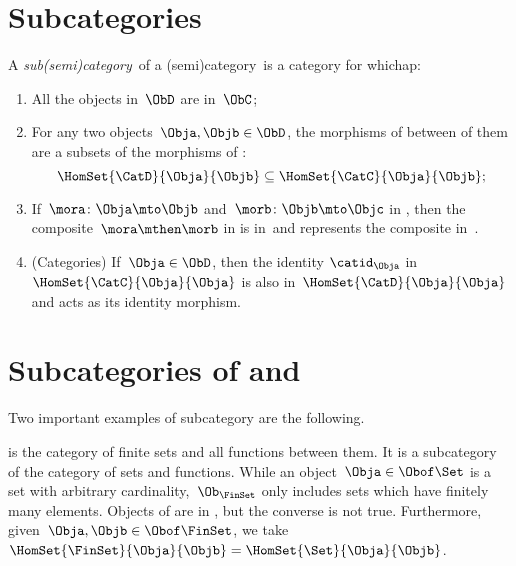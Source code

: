 
\section{Subcategories}
\label{sec:subcategories}


\begin{ctdefinition}[Subcategory]
	\label{def:subcategory}
	A \emph{sub(semi)category}~\CatD of a (semi)category~\CatC is a category for whichap:
	\begin{enumerate}
		\item All the objects in~$\ObD$ are in~$\ObC$;
		\item For any two objects~$\Obja,\Objb\in \ObD$,
		      the morphisms of \CatD between of them are a subsets of the morphisms of \CatC:
		      \begin{equation}
			      \HomSet{\CatD}{\Obja}{\Objb}\subseteq \HomSet{\CatC}{ \Obja}{\Objb};
		      \end{equation}
		\item If~$\mora \colon \Obja \mto \Objb$ and~$\morb\colon \Objb\mto \Objc$ in \CatD, then the composite~$\mora \mthen \morb$ in \CatC is in~\CatD and represents the composite in~\CatD.
		\item (Categories) If~$\Obja\in \ObD$, then the identity $\catid_\Obja$ in $\HomSet{\CatC}{\Obja}{\Obja}$ is also in~$\HomSet{\CatD}{\Obja}{\Obja}$ and acts as its identity morphism.
	\end{enumerate}
\end{ctdefinition}

\section{Subcategories of \Rel and \Set}

Two important examples of subcategory are the following.

\begin{example}[\FinSet]
	\label{ex:FinSet}
	\iindex{\FinSet} is the category of finite sets and all functions between them.
	It is a subcategory of the category \Set of sets and functions.
	While an object~$\Obja \in \Obof\Set$ is a set with arbitrary cardinality,~$\Ob_{\FinSet}$ only includes sets which have finitely many elements.
	Objects of \FinSet are in \Set, but the converse is not true.
	Furthermore, given~$\Obja,\Objb\in \Obof\FinSet$, we take~$\HomSet{\FinSet}{\Obja}{\Objb} =\HomSet{\Set}{\Obja}{\Objb}$.
\end{example}

